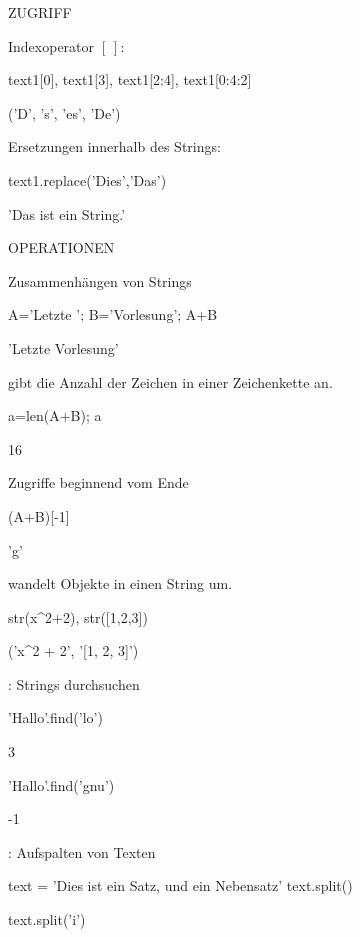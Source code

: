 \documentclass[fontsize=12pt,paper=a4,twoside,bibtotoc,idxtotoc,
liststotoc,pagesize,BCOR1.2cm,DIV15,chapterprefix,pagesize=pdftex]{scrbook}
\theoremstyle{plain}
\theoremstyle{definition}
\theoremstyle{remark}
\begin{document}
ZUGRIFF


 Indexoperator {\color{blue}$[\ ]$}:
\begin{sagein}
text1[0], text1[3], text1[2:4], text1[0:4:2]
\end{sagein}
\begin{sage}
('D', 's', 'es', 'De')
\end{sage}
 Ersetzungen innerhalb des Strings:
\begin{sagein}
text1.replace('Dies','Das')
\end{sagein}
\begin{sage}
'Das ist ein String.'
\end{sage}


OPERATIONEN


 Zusammenhängen von Strings
\begin{sagein}
A='Letzte '; B='Vorlesung'; A+B
\end{sagein}
\begin{sage}
'Letzte Vorlesung'
\end{sage}
  gibt die Anzahl der Zeichen in einer Zeichenkette
an.
\begin{sagein}
a=len(A+B); a
\end{sagein}
\begin{sage}
  16
\end{sage}
  Zugriffe beginnend vom Ende
\begin{sagein}
(A+B)[-1]
\end{sagein}
\begin{sage}
  'g'
\end{sage}
 {\color{blue} } wandelt Objekte in einen String um.
\begin{sagein}
str(x^2+2), str([1,2,3])
\end{sagein}
\begin{sage}
('x^2 + 2', '[1, 2, 3]')
\end{sage}
 : Strings durchsuchen
\begin{sagein}
'Hallo'.find('lo')
\end{sagein}
\begin{sage}
3
\end{sage}
 
\begin{sagein}
'Hallo'.find('gnu')
\end{sagein}
\begin{sage}
-1
\end{sage}
 : Aufspalten von Texten
\begin{sagein}
text = 'Dies ist ein Satz, und ein Nebensatz'
text.split() 
\end{sagein}
\begin{sage}
\end{sage}
\begin{sagein}
text.split('i')
\end{sagein}
\begin{sage}
\end{sage}
\end{document}
